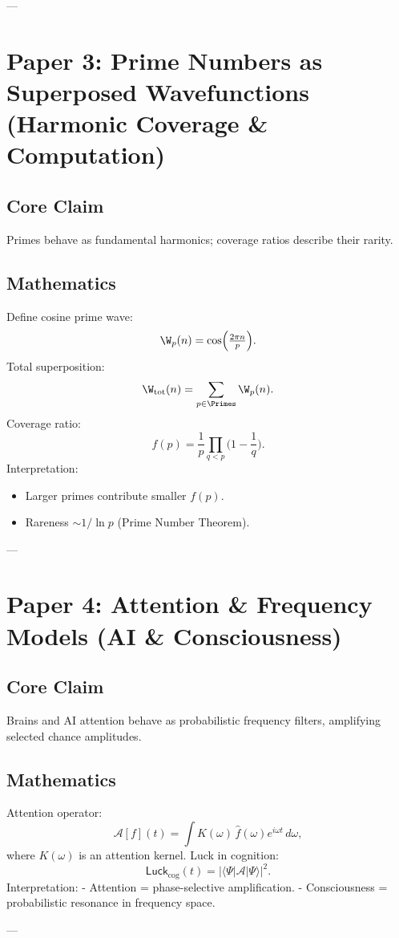 \documentclass[12pt]{article}
\begin{document}
---

\section{Paper 3: Prime Numbers as Superposed Wavefunctions (Harmonic Coverage \& Computation)}
\subsection{Core Claim}
Primes behave as fundamental harmonics; coverage ratios describe their rarity.  

\subsection{Mathematics}
Define cosine prime wave:
\[
\W_p(n)=\cos\!\Big(\tfrac{2\pi n}{p}\Big).
\]
Total superposition:
\[
\W_{\text{tot}}(n)=\sum_{p\in \Primes} \W_p(n).
\]
Coverage ratio:
\[
f(p) = \frac{1}{p}\prod_{q<p}\Big(1-\frac{1}{q}\Big).
\]
Interpretation:
\begin{itemize}
\item Larger primes contribute smaller $f(p)$.  
\item Rareness $\sim 1/\ln p$ (Prime Number Theorem).  
\end{itemize}

---

\section{Paper 4: Attention \& Frequency Models (AI \& Consciousness)}
\subsection{Core Claim}
Brains and AI attention behave as probabilistic frequency filters, amplifying selected chance amplitudes.  

\subsection{Mathematics}
Attention operator:
\[
\mathcal{A}[f](t)=\int K(\omega)\,\hat f(\omega)e^{i\omega t}\,d\omega,
\]
where $K(\omega)$ is an attention kernel.  
Luck in cognition:
\[
\mathsf{Luck}_{\text{cog}}(t) = \big| \langle \Psi | \mathcal{A} | \Psi \rangle \big|^2.
\]
Interpretation:
- Attention = phase-selective amplification.  
- Consciousness = probabilistic resonance in frequency space.  

---
\end{document}
